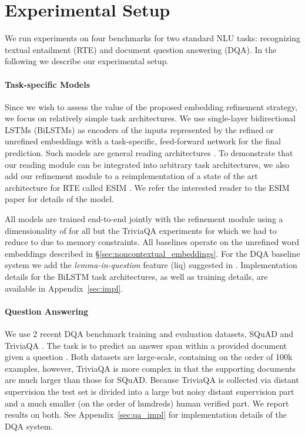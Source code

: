 \documentclass[11pt,a4paper]{article}
\begin{document}
\section{Experimental Setup}
\label{sec:setup}

We run experiments on four benchmarks for two standard NLU tasks: recognizing textual entailment (RTE) and document question answering (DQA). In the following we describe our experimental setup.

\paragraph{Task-specific Models}
Since we wish to assess the value of the proposed embedding refinement strategy, we focus on relatively simple task architectures. We use single-layer bidirectional LSTMs (BiLSTMs) as encoders of the inputs represented by the refined or unrefined embeddings with a task-specific, feed-forward network for the final prediction. Such models are general reading architectures \cite{Bowman2015,Rocktschel2015,Weissenborn2017}. To demonstrate that our reading module can be integrated into arbitrary task architectures, we also add our refinement module to a reimplementation of a state of the art architecture for RTE called ESIM \citep{Chen2017_ESIM}. We refer the interested reader to the ESIM paper for details of the model.

All models are trained end-to-end jointly with the refinement module using a dimensionality of  for all but the TriviaQA experiments for which we had to reduce  to  due to memory constraints. All baselines operate on the unrefined word embeddings  described in \S\ref{sec:noncontextual_embeddings}. For the DQA baseline system we add the \textit{lemma-in-question} feature (liq) suggested in \citet{Weissenborn2017}. Implementation details for the BiLSTM task architectures, as well as training details, are available in Appendix~\ref{sec:impl}.

\paragraph{Question Answering} We use 2 recent DQA benchmark training and evaluation datasets, SQuAD \citep{Rajpurkar2016} and TriviaQA \citep{JoshiTriviaQA2017}. The task is to predict an answer span within a provided document  given a question . Both datasets are large-scale, containing on the order of 100k examples, however, TriviaQA is more complex in that the supporting documents are much larger than those for SQuAD. Because TriviaQA is collected via distant supervision the test set is divided into a large but noisy distant supervision part and a much smaller (on the order of hundreds) human verified part. We report results on both. See Appendix~\ref{sec:qa_impl} for implementation details of the DQA system.
\end{document}
